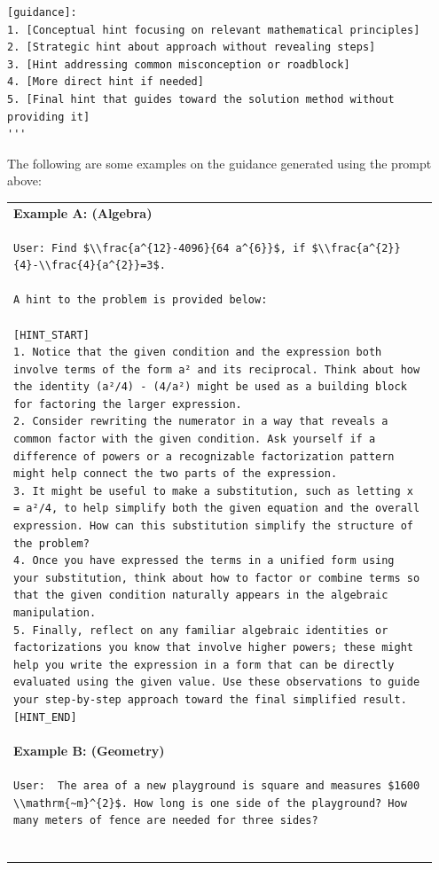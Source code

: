 \documentclass{article}
\begin{document}
{\begin{Verbatim}[breaklines=true]
[guidance]: 
1. [Conceptual hint focusing on relevant mathematical principles]
2. [Strategic hint about approach without revealing steps]
3. [Hint addressing common misconception or roadblock]
4. [More direct hint if needed]
5. [Final hint that guides toward the solution method without providing it]
'''
\end{Verbatim}

The following are some examples on the guidance generated using the prompt above: 

\begin{table}[H]
\centering
\renewcommand{\arraystretch}{1.1}
\begin{tabular}{|p{0.95\linewidth}|}
\hline
\vspace{1mm}
\textbf{Example A: (Algebra)}\\[-0.4em]
\begin{Verbatim}[fontsize=\scriptsize, breaklines=true]
User: Find $\\frac{a^{12}-4096}{64 a^{6}}$, if $\\frac{a^{2}}{4}-\\frac{4}{a^{2}}=3$.

A hint to the problem is provided below:

[HINT_START]
1. Notice that the given condition and the expression both involve terms of the form a² and its reciprocal. Think about how the identity (a²/4) - (4/a²) might be used as a building block for factoring the larger expression. 
2. Consider rewriting the numerator in a way that reveals a common factor with the given condition. Ask yourself if a difference of powers or a recognizable factorization pattern might help connect the two parts of the expression. 
3. It might be useful to make a substitution, such as letting x = a²/4, to help simplify both the given equation and the overall expression. How can this substitution simplify the structure of the problem? 
4. Once you have expressed the terms in a unified form using your substitution, think about how to factor or combine terms so that the given condition naturally appears in the algebraic manipulation. 
5. Finally, reflect on any familiar algebraic identities or factorizations you know that involve higher powers; these might help you write the expression in a form that can be directly evaluated using the given value. Use these observations to guide your step-by-step approach toward the final simplified result.
[HINT_END]
\end{Verbatim}
\\ \hline
\vspace{1mm}
\textbf{Example B: (Geometry)}\\[-0.4em]
\begin{Verbatim}[fontsize=\scriptsize, breaklines=true]
User:  The area of a new playground is square and measures $1600 \\mathrm{~m}^{2}$. How long is one side of the playground? How many meters of fence are needed for three sides?


\end{Verbatim}
\end{tabular}
\end{table}}
\end{document}
